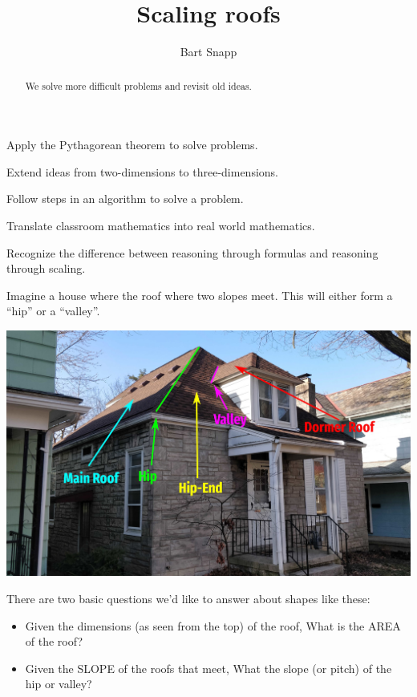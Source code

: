 \documentclass[hints,nooutcomes,noauthor,handout]{ximera}
\title{Scaling roofs}
\author{Bart Snapp}
\begin{document}
\begin{abstract}
  We solve more difficult problems and revisit old ideas.
\end{abstract}
\maketitle


\begin{listOutcomes}
\item Apply the Pythagorean theorem to solve problems.
\item Extend ideas from two-dimensions to three-dimensions.
\item Follow steps in an algorithm to solve a problem.
\item Translate classroom mathematics into real world mathematics.
\item Recognize the difference between reasoning through formulas and
  reasoning through scaling.
\end{listOutcomes}


Imagine a house where the roof where two slopes meet. This will either
form a ``hip'' or a ``valley''.
\begin{center}
  \includegraphics[width=.8\textwidth]{house.jpg}
\end{center}
There are two basic questions we'd like to answer about shapes like these:
\begin{itemize}
\item Given the dimensions (as seen from the top) of the roof, What is the AREA of the roof?
\item Given the SLOPE of the roofs that meet, What the slope (or
  pitch) of the hip or valley?
\end{itemize}


\mynewpage
\end{document}
